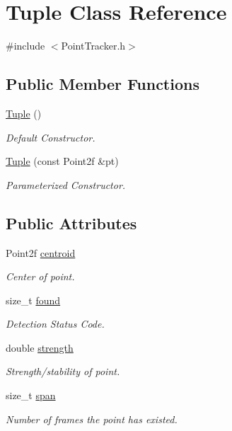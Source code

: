 \hypertarget{class_tuple}{
\section{\-Tuple \-Class \-Reference}
\label{class_tuple}
}


{\ttfamily \#include $<$\-Point\-Tracker.\-h$>$}

\subsection*{\-Public \-Member \-Functions}
\begin{DoxyCompactItemize}
\item 
\hyperlink{class_tuple_a07c616afb195cf694e8814318fbd2aa8}{\-Tuple} ()
\begin{DoxyCompactList}\small\item\em \-Default \-Constructor. \end{DoxyCompactList}\item 
\hyperlink{class_tuple_a0d7fe15e31536827168d2133c4060bbe}{\-Tuple} (const \-Point2f \&pt)
\begin{DoxyCompactList}\small\item\em \-Parameterized \-Constructor. \end{DoxyCompactList}\end{DoxyCompactItemize}
\subsection*{\-Public \-Attributes}
\begin{DoxyCompactItemize}
\item 
\-Point2f \hyperlink{class_tuple_ab3df7dd8c3da6e5d69e20492adcfb1ee}{centroid}
\begin{DoxyCompactList}\small\item\em \-Center of point. \end{DoxyCompactList}\item 
size\-\_\-t \hyperlink{class_tuple_a29532869144a5cfc2b2eb935d91edcd9}{found}
\begin{DoxyCompactList}\small\item\em \-Detection \-Status \-Code. \end{DoxyCompactList}\item 
double \hyperlink{class_tuple_aa2e3ef0462fe1ffb96028cbe5f8324c9}{strength}
\begin{DoxyCompactList}\small\item\em \-Strength/stability of point. \end{DoxyCompactList}\item 
size\-\_\-t \hyperlink{class_tuple_ae321f88dc0b67f9e0f89e51b25db02c5}{span}
\begin{DoxyCompactList}\small\item\em \-Number of frames the point has existed. \end{DoxyCompactList}\end{DoxyCompactItemize}


